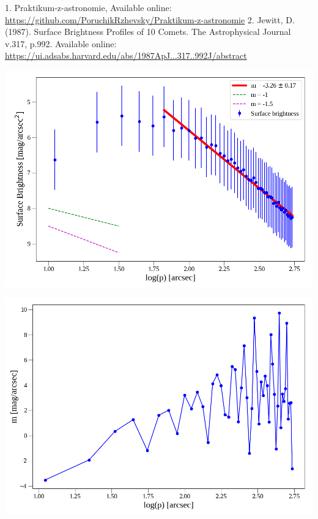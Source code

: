 \documentclass[a4paper,11pt]{article}
\begin{document}
\begin{thebibliography}{9}
        1. Praktikum-z-astronomie, Available online: \url{https://github.com/PoruchikRzhevsky/Praktikum-z-astronomie}
        2. Jewitt, D. (1987). Surface Brightness Profiles of 10 Comets. The Astrophysical Journal v.317, p.992. Available online: \url{https://ui.adsabs.harvard.edu/abs/1987ApJ...317..992J/abstract}
\end{thebibliography}
        
\newpage
    \begin{minipage}[t]{0.5\textwidth}
        \vspace{-15pt}     
        \par \centering
        \includegraphics[scale=0.35]{sbp.png}
        \captionsetup{justification=centeringfont=footnotesize}
        \label{fig:sbp}
        \vspace{10pt}
        \raggedright 

        \vspace{10pt}     
        \par \centering
        \includegraphics[scale=0.35]{grad.png}
        \captionsetup{justification=centeringfont=footnotesize}
        \label{fig:grad}
        \vspace{10pt}
        \raggedright 
    \end{minipage}
\end{document}
